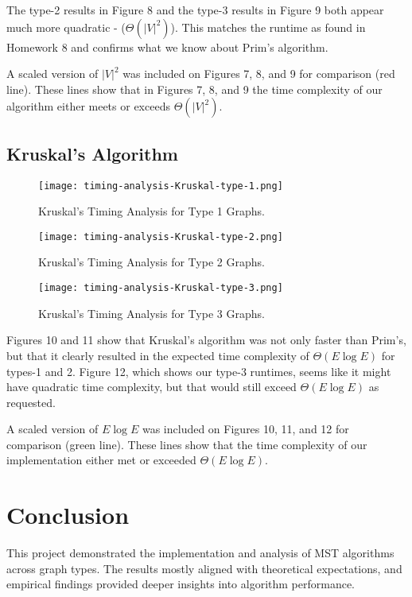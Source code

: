 \documentclass{article}
\begin{document}
The type-2 results in Figure 8 and the type-3 results in Figure 9 both appear much more quadratic - ($\Theta(|V|^2)$). This matches the runtime as found in Homework 8 and confirms what we know about Prim's algorithm. 

A scaled version of $|V|^2$ was included on Figures 7, 8, and 9 for comparison (red line). These lines show that in Figures 7, 8, and 9 the time complexity of our algorithm either meets or exceeds $\Theta(|V|^2)$.

\newpage
\subsection*{Kruskal's Algorithm}

\begin{figure}[h!]
\centering
\texttt{[image: timing-analysis-Kruskal-type-1.png]}
\caption{Kruskal's Timing Analysis for Type 1 Graphs.}
\end{figure}

\begin{figure}[h!]
\centering
\texttt{[image: timing-analysis-Kruskal-type-2.png]}
\caption{Kruskal's Timing Analysis for Type 2 Graphs.}
\end{figure}

\newpage
\begin{figure}[h!]
\centering
\texttt{[image: timing-analysis-Kruskal-type-3.png]}
\caption{Kruskal's Timing Analysis for Type 3 Graphs.}
\end{figure}

Figures 10 and 11 show that Kruskal's algorithm was not only faster than Prim's, but that it clearly resulted in the expected time complexity of $\Theta(E\log E)$ for types-1 and 2. Figure 12, which shows our type-3 runtimes, seems like it might have quadratic time complexity, but that would still exceed $\Theta(E\log E)$ as requested.

A scaled version of $E\log E$ was included on Figures 10, 11, and 12 for comparison (green line). These lines show that the time complexity of our implementation either met or exceeded $\Theta(E\log E)$.


\section*{Conclusion}
This project demonstrated the implementation and analysis of MST algorithms across graph types. The results mostly aligned with theoretical expectations, and empirical findings provided deeper insights into algorithm performance.
\end{document}
